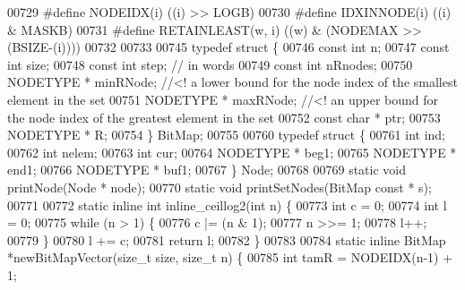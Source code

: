 \begin{DoxyCode}
00729 \textcolor{preprocessor}{#define NODEIDX(i) ((i) >> LOGB)                                                                        }
00730 \textcolor{preprocessor}{#define IDXINNODE(i) ((i) & MASKB)                                                                      }
00731 \textcolor{preprocessor}{#define RETAINLEAST(w, i) ((w) & (NODEMAX >> (BSIZE-(i))))                      }
00732 \textcolor{preprocessor}{}
00733 
00745 \textcolor{keyword}{typedef} \textcolor{keyword}{struct }\{
00746         \textcolor{keyword}{const} \textcolor{keywordtype}{int} n;
00747         \textcolor{keyword}{const} \textcolor{keywordtype}{int} size;
00748         \textcolor{keyword}{const} \textcolor{keywordtype}{int} step;                 \textcolor{comment}{// in words}
00749         \textcolor{keyword}{const} \textcolor{keywordtype}{int} nRnodes;
00750         NODETYPE * minRNode;    \textcolor{comment}{//<! a lower bound for the node index of the smallest element in the set}
00751         NODETYPE * maxRNode;    \textcolor{comment}{//<! an upper bound for the node index of the greatest element in the set}
00752         \textcolor{keyword}{const} \textcolor{keywordtype}{char} * ptr;               
00753         NODETYPE * R;                   
00754 \} BitMap;
00755 
00760 \textcolor{keyword}{typedef} \textcolor{keyword}{struct }\{
00761         \textcolor{keywordtype}{int} ind;                        
00762         \textcolor{keywordtype}{int} nelem;                      
00763         \textcolor{keywordtype}{int} cur;                        
00764         NODETYPE * beg1;        
00765         NODETYPE * end1;        
00766         NODETYPE * buf1;        
00767 \} Node;
00768 
00769 \textcolor{keyword}{static} \textcolor{keywordtype}{void} printNode(Node * node);
00770 \textcolor{keyword}{static} \textcolor{keywordtype}{void} printSetNodes(BitMap \textcolor{keyword}{const} * s);
00771 
00772 \textcolor{keyword}{static} \textcolor{keyword}{inline} \textcolor{keywordtype}{int} inline\_ceillog2(\textcolor{keywordtype}{int} n) \{
00773         \textcolor{keywordtype}{int} c = 0;
00774         \textcolor{keywordtype}{int} l = 0;
00775         \textcolor{keywordflow}{while} (n > 1) \{
00776                 c |= (n & 1);
00777                 n >>= 1;
00778                 l++;
00779         \}
00780         l += c;
00781         \textcolor{keywordflow}{return} l;
00782 \}
00783 
00784 \textcolor{keyword}{static} \textcolor{keyword}{inline} BitMap *newBitMapVector(\textcolor{keywordtype}{size\_t} size, \textcolor{keywordtype}{size\_t} n) \{
00785         \textcolor{keywordtype}{int} tamR = NODEIDX(n-1) + 1;

\end{DoxyCode}

